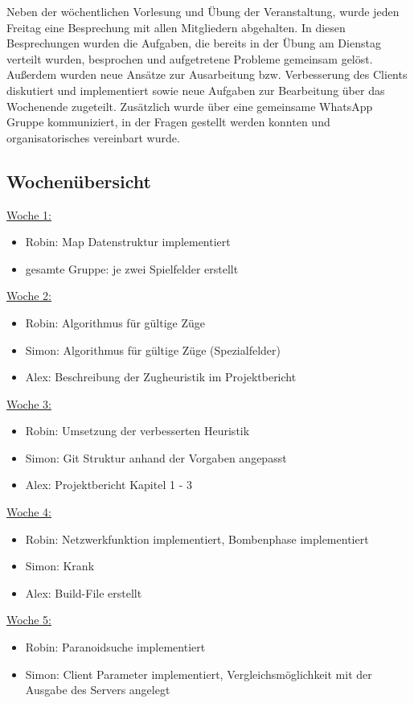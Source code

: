\documentclass[12pt,a4paper,bibliography=totocnumbered,listof=totocnumbered]{article}
\begin{document}
Neben der wöchentlichen Vorlesung und Übung der Veranstaltung, wurde jeden Freitag eine Besprechung mit allen Mitgliedern abgehalten. In diesen Besprechungen wurden die Aufgaben, die bereits in der Übung am Dienstag verteilt wurden, besprochen und aufgetretene Probleme gemeinsam gelöst. Außerdem wurden neue Ansätze zur Ausarbeitung bzw. Verbesserung des Clients diskutiert und implementiert sowie neue Aufgaben zur Bearbeitung über das Wochenende zugeteilt. Zusätzlich wurde über eine gemeinsame WhatsApp Gruppe kommuniziert, in der Fragen gestellt werden konnten und organisatorisches vereinbart wurde.

\newpage

\subsection{Wochenübersicht}
\underline{Woche 1:}
\begin{itemize}
\item Robin: Map Datenstruktur implementiert
\item gesamte Gruppe: je zwei Spielfelder erstellt
\end{itemize}
\underline{Woche 2:}
\begin{itemize}
\item Robin: Algorithmus für gültige Züge
\item Simon: Algorithmus für gültige Züge (Spezialfelder)
\item Alex: Beschreibung der Zugheuristik im Projektbericht
\end{itemize}
\underline{Woche 3:}
\begin{itemize}
\item Robin: Umsetzung der verbesserten Heuristik
\item Simon: Git Struktur anhand der Vorgaben angepasst
\item Alex: Projektbericht Kapitel 1 - 3
\end{itemize}
\underline{Woche 4:}
\begin{itemize}
\item Robin: Netzwerkfunktion implementiert, Bombenphase implementiert
\item Simon: Krank
\item Alex: Build-File erstellt
\end{itemize}
\underline{Woche 5:}
\begin{itemize}
\item Robin: Paranoidsuche implementiert
\item Simon: Client Parameter implementiert, Vergleichsmöglichkeit mit der Ausgabe des Servers angelegt
\end{itemize}
\end{document}
